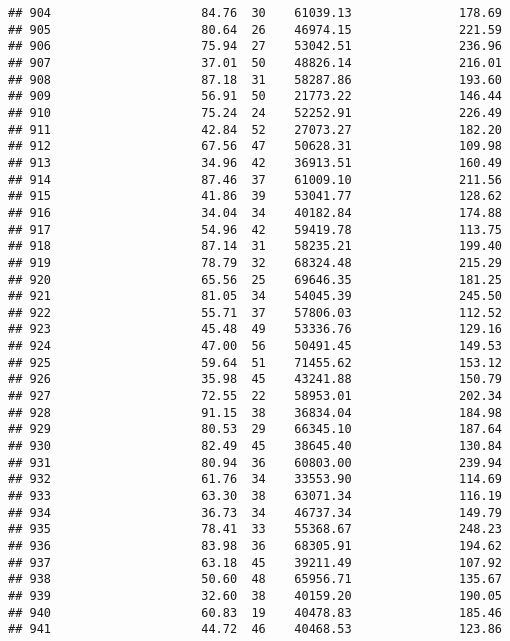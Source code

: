 \documentclass[
]{article}
\begin{document}
\begin{verbatim}
## 904                     84.76  30    61039.13               178.69
## 905                     80.64  26    46974.15               221.59
## 906                     75.94  27    53042.51               236.96
## 907                     37.01  50    48826.14               216.01
## 908                     87.18  31    58287.86               193.60
## 909                     56.91  50    21773.22               146.44
## 910                     75.24  24    52252.91               226.49
## 911                     42.84  52    27073.27               182.20
## 912                     67.56  47    50628.31               109.98
## 913                     34.96  42    36913.51               160.49
## 914                     87.46  37    61009.10               211.56
## 915                     41.86  39    53041.77               128.62
## 916                     34.04  34    40182.84               174.88
## 917                     54.96  42    59419.78               113.75
## 918                     87.14  31    58235.21               199.40
## 919                     78.79  32    68324.48               215.29
## 920                     65.56  25    69646.35               181.25
## 921                     81.05  34    54045.39               245.50
## 922                     55.71  37    57806.03               112.52
## 923                     45.48  49    53336.76               129.16
## 924                     47.00  56    50491.45               149.53
## 925                     59.64  51    71455.62               153.12
## 926                     35.98  45    43241.88               150.79
## 927                     72.55  22    58953.01               202.34
## 928                     91.15  38    36834.04               184.98
## 929                     80.53  29    66345.10               187.64
## 930                     82.49  45    38645.40               130.84
## 931                     80.94  36    60803.00               239.94
## 932                     61.76  34    33553.90               114.69
## 933                     63.30  38    63071.34               116.19
## 934                     36.73  34    46737.34               149.79
## 935                     78.41  33    55368.67               248.23
## 936                     83.98  36    68305.91               194.62
## 937                     63.18  45    39211.49               107.92
## 938                     50.60  48    65956.71               135.67
## 939                     32.60  38    40159.20               190.05
## 940                     60.83  19    40478.83               185.46
## 941                     44.72  46    40468.53               123.86

\end{verbatim}
\end{document}
